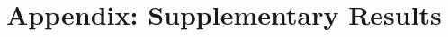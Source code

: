 \documentclass[phd]{UWMThesis}
\renewcommand{\.}{\textrm{ .}}
\theoremstyle{definition}
\numberwithin{thm}{chapter}
\begin{document}
	\ThesisAppendix
	
	
	\renewcommand{\theequation}{A\arabic{equation}}
	\renewcommand{\thetable}{A\arabic{table}}
	\renewcommand{\thethm}{A.\arabic{thm}}
	
\chapter{Appendix: Supplementary Results}
\end{document}
